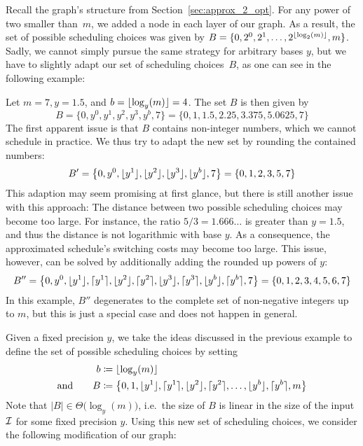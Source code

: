 Recall the graph's structure from Section~\ref{sec:approx_2_opt}. For any power of two smaller than~$m$, we added a node in each layer of our graph. As a result, the set of possible scheduling choices was given by $B=\{0,2^0,2^1,\dotsc,2^{\lfloor\log_2(m)\rfloor},m\}$. 
Sadly, we cannot simply pursue the same strategy for arbitrary bases $y$, but we have to slightly adapt our set of scheduling choices~$B$, as one can see in the following example:
\begin{exmpl}
Let $m=7,y=1.5$, and $b=\lfloor\log_y(m)\rfloor=4$. The set $B$ is then given by 
\begin{equation*}
	B=\{0,y^0,y^1,y^2,y^3,y^b,7\}=\{0,1,1.5,2.25,3.375,5.0625,7\}
\end{equation*}	
The first apparent issue is that $B$ contains non-integer numbers, which we cannot schedule in practice. We thus try to adapt the new set by rounding the contained numbers:
\begin{equation*}
	B'=\left\{0,y^0,\lfloor y^1\rfloor,\lfloor y^2\rfloor,\lfloor y^3\rfloor,\lfloor y^b\rfloor,7\right\}=\{0,1,2,3,5,7\}
\end{equation*}
This adaption may seem promising at first glance, but there is still another issue with this approach: The distance between two possible scheduling choices may become too large. For instance, the ratio $5/3=1.666\dotso$ is greater than $y=1.5$, and thus the distance is not logarithmic with base $y$. As a consequence, the approximated schedule's switching costs may become too large. This issue, however, can be solved by additionally adding the rounded up powers of $y$:
\begin{equation*}
	B''=\left\{0,y^0,\lfloor y^1\rfloor,\lceil y^1\rceil,\lfloor y^2\rfloor,\lceil y^2\rceil,\lfloor y^3\rfloor,\lceil y^3\rceil,\lfloor y^b\rfloor,\lceil y^b\rceil,7\right\}=\{0,1,2,3,4,5,6,7\}
\end{equation*}
In this example, $B''$ degenerates to the complete set of non-negative integers up to $m$, but this is just a special case and does not happen in general.
\end{exmpl}
Given a fixed precision $y$, we take the ideas discussed in the previous example to define the set of possible scheduling choices by setting
\begin{align*}
	b&\coloneqq\lfloor\log_y(m)\rfloor\\
	\text{and}\qquad B&\coloneqq\left\{0,1,\lfloor y^1\rfloor,\lceil y^1\rceil,\lfloor y^2\rfloor,\lceil y^2\rceil,\dotsc,\lfloor y^b\rfloor,\lceil y^b\rceil,m\right\}
\end{align*}
Note that $|B|\in\Theta\bigl(\log_y(m)\bigr)$, i.e.\ the size of $B$ is linear in the size of the input $\mathcal{I}$ for some fixed precision $y$. Using this new set of scheduling choices, we consider the following modification of our graph:
